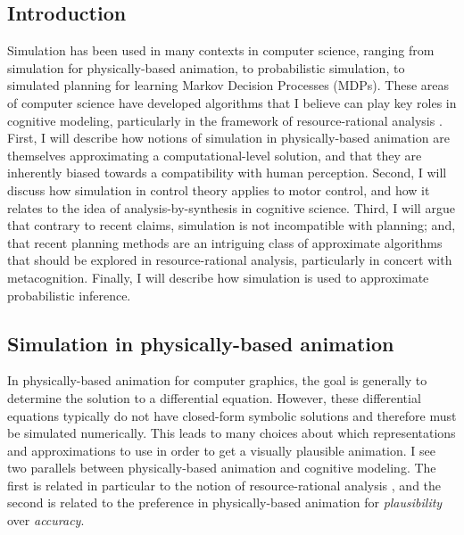 \documentclass[12pt]{article}
\begin{document}


\subsection*{Introduction}

Simulation has been used in many contexts in computer science, ranging from simulation for physically-based animation, to probabilistic simulation, to simulated planning for learning Markov Decision Processes (MDPs). These areas of computer science have developed algorithms that I believe can play key roles in cognitive modeling, particularly in the framework of resource-rational analysis \citep{Griffiths2015}. First, I will describe how notions of simulation in physically-based animation are themselves approximating a computational-level solution, and that they are inherently biased towards a compatibility with human perception. Second, I will discuss how simulation in control theory applies to motor control, and how it relates to the idea of analysis-by-synthesis \citep{Halle1959,Halle1962} in cognitive science. Third, I will argue that contrary to recent claims, simulation is not incompatible with planning; and, that recent planning methods are an intriguing class of approximate algorithms that should be explored in resource-rational analysis, particularly in concert with metacognition. Finally, I will describe how simulation is used to approximate probabilistic inference.

\subsection*{Simulation in physically-based animation}

In physically-based animation for computer graphics, the goal is generally to determine the solution to a differential equation. However, these differential equations typically do not have closed-form symbolic solutions and therefore must be simulated numerically. This leads to many choices about which representations and approximations to use in order to get a visually plausible animation. I see two parallels between physically-based animation and cognitive modeling. The first is related in particular to the notion of resource-rational analysis \citep{Griffiths2015}, and the second is related to the preference in physically-based animation for \textit{plausibility} over \textit{accuracy}.
\end{document}
